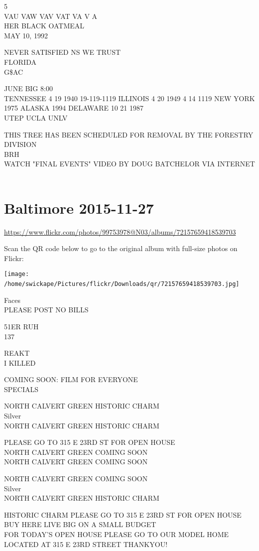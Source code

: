 \documentclass[10pt,letterpaper]{article}
\begin{document}
5\\
VAU VAW VAV VAT VA V A\\
HER BLACK OATMEAL\\
MAY 10, 1992

NEVER SATISFIED NS WE TRUST\\
FLORIDA\\
G\$AC

JUNE BIG 8:00\\
TENNESSEE 4 19 1940 19{-}119{-}1119 ILLINOIS 4 20 1949 4 14 1119 NEW YORK 1975 ALASKA 1994 DELAWARE 10 21 1987\\
UTEP UCLA UNLV

THIS TREE HAS BEEN SCHEDULED FOR REMOVAL BY THE FORESTRY DIVISION\\
BRH\\
WATCH "FINAL EVENTS" VIDEO BY DOUG BATCHELOR VIA INTERNET
\

\section*{Baltimore 2015-11-27}

\url{https://www.flickr.com/photos/99753978@N03/albums/72157659418539703}

Scan the QR code below to go to the original album with full-size photos on Flickr:

\texttt{[image: /home/swickape/Pictures/flickr/Downloads/qr/72157659418539703.jpg]}
\

Faces\\
PLEASE POST NO BILLS

51ER RUH\\
137

REAKT\\
I KILLED

COMING SOON: FILM FOR EVERYONE\\
SPECIALS

NORTH CALVERT GREEN HISTORIC CHARM\\
Silver\\
NORTH CALVERT GREEN HISTORIC CHARM

PLEASE GO TO 315 E 23RD ST FOR OPEN HOUSE\\
NORTH CALVERT GREEN COMING SOON\\
NORTH CALVERT GREEN COMING SOON

NORTH CALVERT GREEN COMING SOON\\
Silver\\
NORTH CALVERT GREEN HISTORIC CHARM

HISTORIC CHARM PLEASE GO TO 315 E 23RD ST FOR OPEN HOUSE\\
BUY HERE LIVE BIG ON A SMALL BUDGET\\
FOR TODAY'S OPEN HOUSE PLEASE GO TO OUR MODEL HOME LOCATED AT 315 E 23RD STREET THANKYOU!
\end{document}
